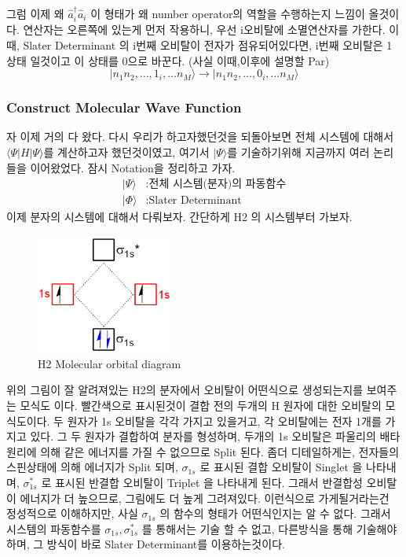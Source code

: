\documentclass[10pt]{article}
\begin{document}
그럼 이제 왜 \(\hat{a}_i^{\dagger}\hat{a}_i\) 이 형태가 왜 number operator의 역할을 수행하는지 느낌이 올것이다. 
연산자는 오른쪽에 있는게 먼저 작용하니, 우선 i오비탈에 소멸연산자를 가한다. 이때, Slater Determinant 의 i번째 오비탈이 전자가 점유되어있다면, 
i번째 오비탈은 1상태 일것이고 이 상태를 0으로 바꾼다. (사실 이때,이후에 설명할 Par)
\[
\vert n_1 n_2 ,\dots, 1_i ,\dots n_M \rangle \rightarrow \vert n_1 n_2 ,\dots, 0_i ,\dots n_M \rangle
\]




\subsubsection{Construct Molecular Wave Function}
자 이제 거의 다 왔다. 다시 우리가 하고자했던것을 되돌아보면 전체 시스템에 대해서 \(\langle \Psi|H|\Psi \rangle\)를 계산하고자 했던것이였고, 
여기서 \(|\Psi \rangle \)를 기술하기위해 지금까지 여러 논리들을 이어왔었다. 
잠시 Notation을 정리하고 가자. 
\begin{align*}
| \Psi \rangle &: \text{전체 시스템(분자)의 파동함수}\\
| \Phi \rangle &: \text{Slater Determinant}
\end{align*}
이제 분자의 시스템에 대해서 다뤄보자. 
간단하게 H2 의 시스템부터 가보자. 

\begin{figure}[htbp]
  \centering
  \includegraphics[width=0.4\textwidth]{fig/Moecular-Orbital-DiagramH2.png}
  \caption{H2 Molecular orbital diagram}
  \label{fig:example2}
\end{figure}

위의 그림이 잘 알려져있는 H2의 분자에서 오비탈이 어떤식으로 생성되는지를 보여주는 모식도 이다. 
빨간색으로 표시된것이 결합 전의 두개의 H 원자에 대한 오비탈의 모식도이다. 두 원자가 1s 오비탈을 각각 가지고 있을거고, 각 오비탈에는 전자 1개를 가지고 있다. 
그 두 원자가 결합하여 분자를 형성하며, 두개의 1s 오비탈은 파울리의 배타원리에 의해 같은 에너지를 가질 수 없으므로 Split 된다. 좀더 디테일하게는, 전자들의 스핀상태에 의해 에너지가 Split 되며, 
\(\sigma_{1s}\) 로 표시된 결합 오비탈이 Singlet 을 나타내며, \(\sigma_{1s}^*\) 로 표시된 반결합 오비탈이 Triplet 을 나타내게 된다. 그래서 반결합성 오비탈이 에너지가 더 높으므로, 그림에도 더 높게 그려져있다. 
이런식으로 가게될거라는건 정성적으로 이해하지만, 사실 \(\sigma_{1s}\) 의 함수의 형태가 어떤식인지는 알 수 없다. 
그래서 시스템의 파동함수를 \(\sigma_{1s},\sigma_{1s}^*\) 를 통해서는 기술 할 수 없고, 다른방식을 통해 기술해야하며, 그 방식이 바로 Slater Determinant를 이용하는것이다. 
\end{document}
